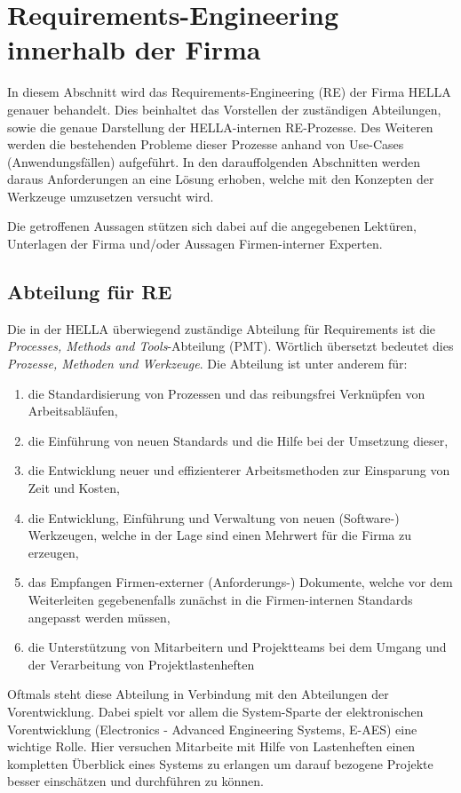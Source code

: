 \documentclass[12pt]{report}
\begin{document}
\section[RE bei HELLA]{Requirements-Engineering innerhalb der Firma}
In diesem Abschnitt wird das Requirements-Engineering (RE) der Firma HELLA genauer behandelt. Dies beinhaltet das Vorstellen der zuständigen Abteilungen, sowie die genaue Darstellung der HELLA-internen RE-Prozesse. Des Weiteren werden die bestehenden Probleme dieser Prozesse anhand von Use-Cases (Anwendungsfällen) aufgeführt. In den darauffolgenden Abschnitten werden daraus Anforderungen an eine Lösung erhoben, welche mit den Konzepten der Werkzeuge umzusetzen versucht wird.

Die getroffenen Aussagen stützen sich dabei auf die angegebenen Lektüren, Unterlagen der Firma und/oder Aussagen Firmen-interner Experten. 
\subsection{Abteilung für RE}
Die in der HELLA überwiegend zuständige Abteilung für Requirements ist die \textit{Processes, Methods and Tools}-Abteilung (PMT). Wörtlich übersetzt bedeutet dies \textit{Prozesse, Methoden und Werkzeuge}. Die Abteilung ist unter anderem für: 
\begin{enumerate}
\item die Standardisierung von Prozessen und das reibungsfrei Verknüpfen von Arbeitsabläufen,
\item die Einführung von neuen Standards und die Hilfe bei der Umsetzung dieser,
\item die Entwicklung neuer und effizienterer Arbeitsmethoden zur Einsparung von Zeit und Kosten,
\item die Entwicklung, Einführung und Verwaltung von neuen (Software-) Werkzeugen, welche in der Lage sind einen Mehrwert für die Firma zu erzeugen,
\item das Empfangen Firmen-externer (Anforderungs-) Dokumente, welche vor dem Weiterleiten gegebenenfalls zunächst in die Firmen-internen Standards angepasst werden müssen, 
\item die Unterstützung von Mitarbeitern und Projektteams bei dem Umgang und der Verarbeitung von Projektlastenheften
\end{enumerate}

Oftmals steht diese Abteilung in Verbindung mit den Abteilungen der Vorentwicklung. Dabei spielt vor allem die System-Sparte der elektronischen Vorentwicklung (Electronics - Advanced Engineering Systems, E-AES) eine wichtige Rolle. Hier versuchen Mitarbeite mit Hilfe von Lastenheften einen kompletten Überblick eines Systems zu erlangen um darauf bezogene Projekte besser einschätzen und durchführen zu können. 
\end{document}
